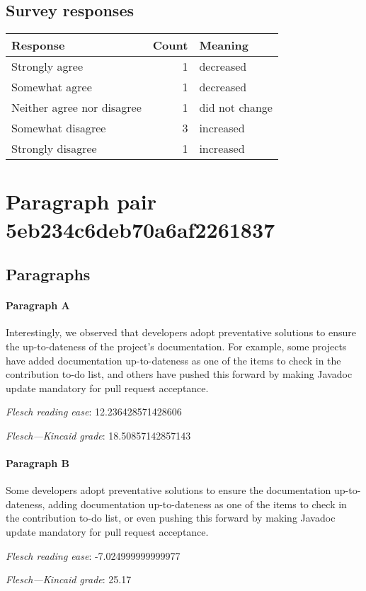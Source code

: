 \subsection{Survey responses}
\begin{tabular}{lrl}
\toprule
          \textbf{Response} &  \textbf{Count} & \textbf{Meaning} \\
\midrule
             Strongly agree &               1 &        decreased \\
             Somewhat agree &               1 &        decreased \\
 Neither agree nor disagree &               1 &   did not change \\
          Somewhat disagree &               3 &        increased \\
          Strongly disagree &               1 &        increased \\
\bottomrule
\end{tabular}

\section{Paragraph pair 5eb234c6deb70a6af2261837}
\subsection{Paragraphs}
\paragraph{Paragraph A}
Interestingly, we observed that developers adopt preventative solutions to ensure the up-to-dateness of the project's documentation. For example, some projects have added documentation up-to-dateness as one of the items to check in the contribution to-do list, and others have pushed this forward by making Javadoc update mandatory for pull request acceptance.\par\medskip\emph{Flesch reading ease}: 12.236428571428606\par\emph{Flesch---Kincaid grade}: 18.50857142857143

\paragraph{Paragraph B}
Some developers adopt preventative solutions to ensure the documentation up-to-dateness, adding documentation up-to-dateness as one of the items to check in the contribution to-do list, or even pushing this forward by making Javadoc update mandatory for pull request acceptance.\par\medskip\emph{Flesch reading ease}: -7.024999999999977\par\emph{Flesch---Kincaid grade}: 25.17

